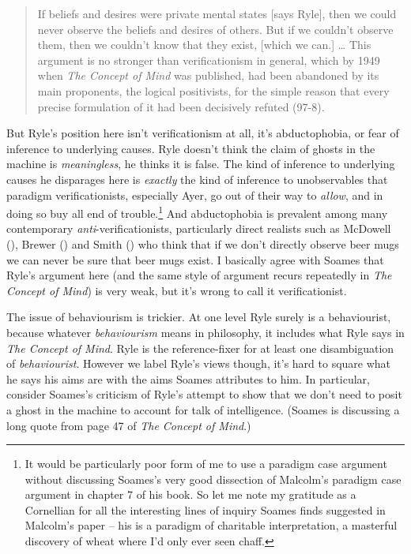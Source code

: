\documentclass[
  11pt,
  letterpaper,
  DIV=11,
  numbers=noendperiod,
  twoside]{scrartcl}
\begin{document}
\begin{quote}
If beliefs and desires were private mental states {[}says Ryle{]}, then
we could never observe the beliefs and desires of others. But if we
couldn't observe them, then we couldn't know that they exist, {[}which
we can.{]} \ldots{} This argument is no stronger than verificationism in
general, which by 1949 when \emph{The Concept of Mind} was published,
had been abandoned by its main proponents, the logical positivists, for
the simple reason that every precise formulation of it had been
decisively refuted (97-8).
\end{quote}

But Ryle's position here isn't verificationism at all, it's
abductophobia, or fear of inference to underlying causes. Ryle doesn't
think the claim of ghosts in the machine is \emph{meaningless}, he
thinks it is false. The kind of inference to underlying causes he
disparages here is \emph{exactly} the kind of inference to unobservables
that paradigm verificationists, especially Ayer, go out of their way to
\emph{allow}, and in doing so buy all end of trouble.\footnote{It would
  be particularly poor form of me to use a paradigm case argument
  without discussing Soames's very good dissection of Malcolm's paradigm
  case argument in chapter 7 of his book. So let me note my gratitude as
  a Cornellian for all the interesting lines of inquiry Soames finds
  suggested in Malcolm's paper -- his is a paradigm of charitable
  interpretation, a masterful discovery of wheat where I'd only ever
  seen chaff.} And abductophobia is prevalent among many contemporary
\emph{anti}-verificationists, particularly direct realists such as
McDowell (), Brewer
() and Smith
() who think that if we don't directly
observe beer mugs we can never be sure that beer mugs exist. I basically
agree with Soames that Ryle's argument here (and the same style of
argument recurs repeatedly in \emph{The Concept of Mind}) is very weak,
but it's wrong to call it verificationist.

The issue of behaviourism is trickier. At one level Ryle surely is a
behaviourist, because whatever \emph{behaviourism} means in philosophy,
it includes what Ryle says in \emph{The Concept of Mind}. Ryle is the
reference-fixer for at least one disambiguation of \emph{behaviourist}.
However we label Ryle's views though, it's hard to square what he says
his aims are with the aims Soames attributes to him. In particular,
consider Soames's criticism of Ryle's attempt to show that we don't need
to posit a ghost in the machine to account for talk of intelligence.
(Soames is discussing a long quote from page 47 of \emph{The Concept of
Mind}.)
\end{document}
